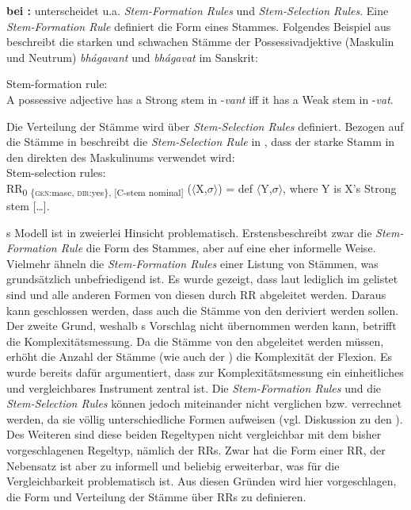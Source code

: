 \begin{exe}
\begin{exe}
\noindent
\textbf{ bei \citet{Stump2001}:} \citet{Stump2001} unterscheidet u.a. \textit{Stem-Formation Rules} und \textit{Stem-Selection Rules}. Eine \textit{Stem-Formation Rule} definiert die Form eines Stammes. Folgendes Beispiel aus \citet{Stump2001} beschreibt die starken und schwachen Stämme der Possessivadjektive (Maskulin und Neutrum) \textit{bhágavant} und \textit{bhágavat} im Sanskrit:

\ea%
    \label{ex:key:40}
Stem-formation rule:\\
A possessive adjective has a Strong stem in -\textit{vant} iff it has a Weak stem in -\textit{vat}. \citep[172]{Stump2001}
\z

Die Verteilung der Stämme wird über \textit{Stem-Selection Rules} definiert. Bezogen auf die Stämme in  beschreibt die \textit{Stem-Selection Rule} in , dass der starke Stamm in den direkten  des Maskulinums verwendet wird:\\

\ea%
    \label{ex:key:41}
Stem-selection rules:\\\relax
[…] RR\textsubscript{0 \{\textsc{gen}:masc, \textsc{dir:}yes\}, [C-stem nominal]} ($\langle$X,$\sigma$$\rangle$) = def $\langle$Y,$\sigma$$\rangle$, where Y is X’s Strong stem […]. \citep[179]{Stump2001}
\z

\citeauthor{Stump2001}s \citeyearpar{Stump2001} Modell ist in zweierlei Hinsicht problematisch. Erstens\linebreak beschreibt zwar die \textit{Stem-Formation Rule} die Form des Stammes, aber auf eine eher informelle Weise. Vielmehr ähneln die \textit{Stem-Formation Rules} einer Listung von Stämmen, was grundsätzlich unbefriedigend ist. Es wurde gezeigt, dass laut \citet{AckermanStump2004} lediglich  im  gelistet sind und alle anderen Formen von diesen  durch RR abgeleitet werden. Daraus kann geschlossen werden, dass auch die Stämme von den  deriviert werden sollen. Der zweite Grund, weshalb \citeauthor{Stump2001}s \citeyearpar{Stump2001} Vorschlag nicht übernommen werden kann, betrifft die Komplexitätsmessung. Da die Stämme von den  abgeleitet werden müssen, erhöht die Anzahl der Stämme (wie auch der ) die Komplexität der Flexion. Es wurde bereits dafür argumentiert, dass zur Komplexitätsmessung ein einheitliches und vergleichbares Instrument zentral ist. Die \textit{Stem-Formation Rules} und die \textit{Stem-Selection Rules} können jedoch miteinander nicht verglichen bzw. verrechnet werden, da sie völlig unterschiedliche Formen aufweisen (vgl. Diskussion zu den ). Des Weiteren sind diese beiden Regeltypen nicht vergleichbar mit dem bisher vorgeschlagenen Regeltyp, nämlich der RRs. Zwar hat  die Form einer RR, der Nebensatz ist aber zu informell und beliebig erweiterbar, was für die Vergleichbarkeit problematisch ist. Aus diesen Gründen wird hier vorgeschlagen, die Form und Verteilung der Stämme über RRs zu definieren.\\


\end{exe}
\end{exe}
